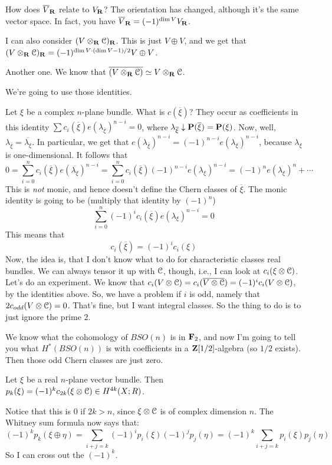 How does $\overline{V}_\mathbf R$ relate to $V_\mathbf R$?
The orientation has changed, although it's the same vector space.
In fact, you have $\overline{V}_\mathbf R = (-1)^{\dim V} V_\mathbf R$.

I can also consider $(V\otimes_\mathbf R\mathcal C)_\mathbf R$.
This is just $V\oplus V$, and we get that $(V\otimes_\mathbf R\mathcal C)_\mathbf R = (-1)^{\dim V\cdot(\dim V - 1)/2} V\oplus V$.

Another one.
We know that $\overline{(V\otimes_\mathbf R\mathcal C)}\simeq V\otimes_\mathbf R\mathcal C$.

We're going to use those identities.

Let $\xi$ be a complex $n$-plane bundle.
What is $c(\overline{\xi})$?
They occur as coefficients in this identity $\sum c_i(\overline{\xi}) e(\lambda_{\overline{\xi}})^{n-i} = 0$, where $\lambda_{\overline{\xi}}\downarrow \mathbf P(\overline{\xi}) = \mathbf P(\xi)$.
Now, well, $\lambda_{\overline{\xi}} = \overline{\lambda_\xi}$.
In particular, we get that $e(\lambda_{\overline{\xi}})^{n-i} = (-1)^{n-i}e(\lambda_\xi)^{n-i}$, because $\lambda_\xi$ is one-dimensional.
It follows that
$$
0 = \sum^n_{i=0}c_i(\overline{\xi})e(\overline{\lambda_\xi})^{n-i} = \sum^n_{i=0}c_i(\overline{\xi}) (-1)^{n-i}e(\lambda_\xi)^{n-i} = (-1)^n e(\lambda_\xi)^n + \cdots
$$
This is \emph{not} monic, and hence doesn't define the Chern classes of $\overline{\xi}$.
The monic identity is going to be (multiply that identity by $(-1)^n$)
$$
\sum^n_{i=0}(-1)^ic_i(\overline{\xi})e(\lambda_\xi)^{n-i} = 0
$$
This means that
$$
\boxed{c_i(\overline{\xi}) = (-1)^ic_i(\xi)}
$$
Now, the idea is, that I don't know what to do for characteristic classes real bundles.
We can always tensor it up with $\mathcal C$, though, i.e., I can look at $c_i(\xi\otimes\mathcal C)$.
Let's do an experiment.
We know that $c_i(V\otimes\mathcal C) = c_i(\overline{V\otimes\mathcal C}) = (-1)^ic_i(V\otimes\mathcal C)$, by the identities above.
So, we have a problem if $i$ is odd, namely that $2c_{odd}(V\otimes\mathcal C) = 0$.
That's fine, but I want integral classes.
So the thing to do is to just ignore the prime $2$.

We know what the cohomology of $BSO(n)$ is in $\mathbf F_2$, and now I'm going to tell you what $H^\ast(BSO(n))$ is with coefficients in a $\mathbf Z[1/2]$-algebra (so $1/2$ exists).
Then those odd Chern classes are just zero.
\begin{definition}
    Let $\xi$ be a real $n$-plane vector bundle.
    Then $p_k(\xi) = (-1)^kc_{2k}(\xi\otimes\mathcal C)\in H^{4k}(X;R)$.
\end{definition}
Notice that this is $0$ if $2k>n$, since $\xi\otimes\mathcal C$ is of complex dimension $n$.
The Whitney sum formula now says that:
$$
(-1)^k p_k(\xi\oplus\eta) = \sum_{i+j = k}(-1)^i p_i(\xi) (-1)^j p_j(\eta) = (-1)^k\sum_{i+j=k}p_i(\xi)p_j(\eta)
$$
So I can cross out the $(-1)^k$.

